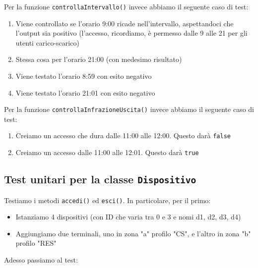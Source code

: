 \documentclass[12pt, letterpaper]{article}
\begin{document}
\noindent
Per la funzione \texttt{controllaIntervallo()}
invece abbiamo il seguente caso di test:

\begin{enumerate}
    \item Viene controllato se l'orario 9:00 
    ricade nell'intervallo, aspettandoci che 
    l'output sia positivo (l'accesso, ricordiamo,
    è permesso dalle 9 alle 21 per gli utenti 
    carico-scarico)
    \item Stessa cosa per l'orario 21:00 (con 
    medesimo risultato)
    \item Viene testato l'orario 8:59 con esito 
    negativo
    \item Viene testato l'orario 21:01 con esito 
    negativo
\end{enumerate}

\noindent
Per la funzione \texttt{controllaInfrazioneUscita()}
invece abbiamo il seguente caso di test:

\begin{enumerate}
    \item Creiamo un accesso che dura dalle 11:00
    alle 12:00. Questo darà \texttt{false}
    \item Creiamo un accesso dalle 11:00 alle 
    12:01. Questo darà \texttt{true}
\end{enumerate}

\subsection{Test unitari per la classe
\texttt{Dispositivo}}
Testiamo i metodi \texttt{accedi()} ed \texttt{esci()}.
In particolare, per il primo:

\begin{itemize}
    \item Istanziamo 4 dispositivi (con ID che varia 
    tra 0 e 3 e nomi d1, d2, d3, d4)
    \item Aggiungiamo due terminali, uno in zona 
    "a" profilo "CS", e l'altro in zona "b" profilo 
    "RES"
\end{itemize}

\noindent
Adesso passiamo al test:
\end{document}
